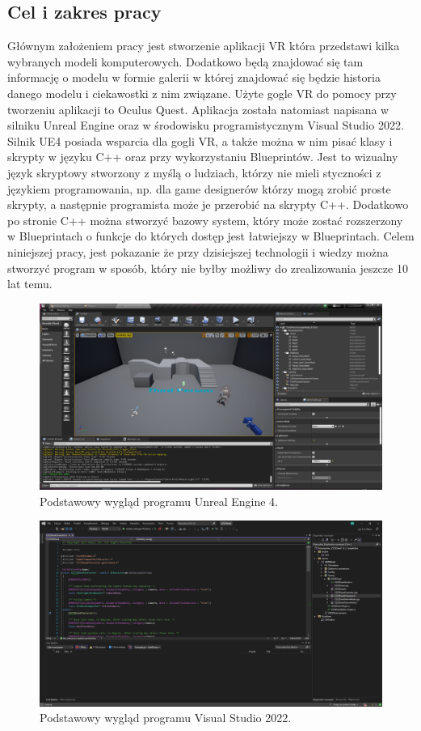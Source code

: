 \documentclass[a4paper,12pt,reqno]{article}
\begin{document}
\subsection{Cel i zakres pracy}

Głównym założeniem pracy jest stworzenie aplikacji VR która przedstawi kilka wybranych
modeli komputerowych. Dodatkowo będą znajdować się tam informację o modelu w formie galerii w
której znajdować się będzie historia danego modelu i ciekawostki z nim związane.
Użyte gogle VR do pomocy przy tworzeniu aplikacji to Oculus Quest. Aplikacja została natomiast napisana w silniku Unreal Engine oraz w środowisku programistycznym Visual Studio 2022. Silnik UE4 posiada wsparcia dla gogli VR, a także można w nim pisać klasy i skrypty w języku C++ oraz przy wykorzystaniu Blueprintów. Jest to wizualny język skryptowy stworzony z myślą o ludziach, którzy nie mieli styczności z językiem programowania, np. dla game designerów którzy  mogą zrobić proste skrypty, a następnie programista może je przerobić na skrypty C++. Dodatkowo po stronie C++ można stworzyć bazowy system, który może zostać rozszerzony w Blueprintach o funkcje do których dostęp jest łatwiejszy w Blueprintach. Celem niniejszej pracy, jest pokazanie że przy dzisiejszej technologii i wiedzy można stworzyć program w sposób, który nie
byłby możliwy do zrealizowania jeszcze 10 lat temu.

\begin{figure}[!ht]%
\centering
\includegraphics[width=0.8\columnwidth]{graphics/UE4View.png}
\caption{Podstawowy wygląd programu Unreal Engine 4.
\label{OpenBrush}}%
%
\qquad
\end{figure}  

\begin{figure}[!ht]%
\centering
\includegraphics[width=0.8\columnwidth]{graphics/VSView.png}
\caption{Podstawowy wygląd programu Visual Studio 2022.
\label{OpenBrush}}%
%
\qquad
\end{figure}  
\end{document}
